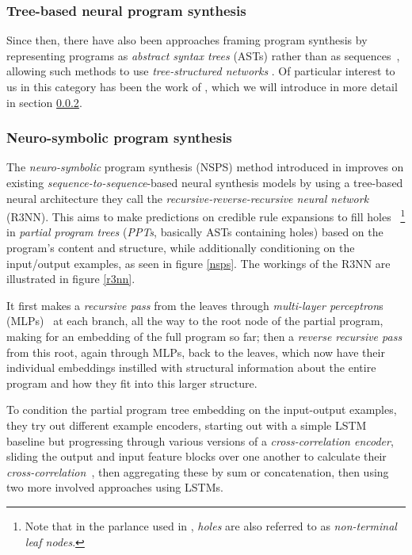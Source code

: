 \documentclass{article}
\begin{document}
\subsubsection{Tree-based neural program synthesis}

Since then, there have also been approaches framing program synthesis by representing programs as \emph{abstract syntax trees} (ASTs) rather than as sequences~\citep{polosukhin2018neural},
allowing such methods to use \emph{tree-structured networks}%
.
Of particular interest to us in this category has been the work of \citet{nsps},
which we will introduce in more detail in section \ref{sec:nsps}.

\subsubsection{Neuro-symbolic program synthesis} \label{sec:nsps}

The \emph{neuro-symbolic} program synthesis (NSPS) method introduced in \citet{nsps} improves on existing \emph{sequence-to-sequence}-based neural synthesis models by using a tree-based neural architecture they call the \emph{recursive-reverse-recursive neural network} (R3NN).
This aims to make predictions on credible rule expansions to fill holes%
~\footnote{Note that in the parlance used in \citet{nsps}, \emph{holes} are also referred to as \emph{non-terminal leaf nodes}.}
in \emph{partial program trees} (\emph{PPTs}, basically ASTs containing holes) based on the program's content and structure,
while additionally conditioning on the input/output examples, as seen in figure \ref{nsps}.
The workings of the R3NN are illustrated in figure \ref{r3nn}.

It first makes a \emph{recursive pass} from the leaves through \emph{multi-layer perceptron}s (MLPs)~\citep{rosenblatt1961principles} at each branch,
all the way to the root node of the partial program, making for an embedding of the full program so far;
then a \emph{reverse recursive pass} from this root, again through MLPs, back to the leaves,
which now have their individual embeddings instilled with structural information about the entire program and how they fit into this larger structure.

To condition the partial program tree embedding on the input-output examples,
they try out different example encoders, starting out with a simple LSTM baseline but progressing through various versions of a \emph{cross-correlation encoder},
sliding the output and input feature blocks over one another to calculate their \emph{cross-correlation}~\citep{bracewell1986fourier},
then aggregating these by sum or concatenation,
then using two more involved approaches using LSTMs.
\end{document}
